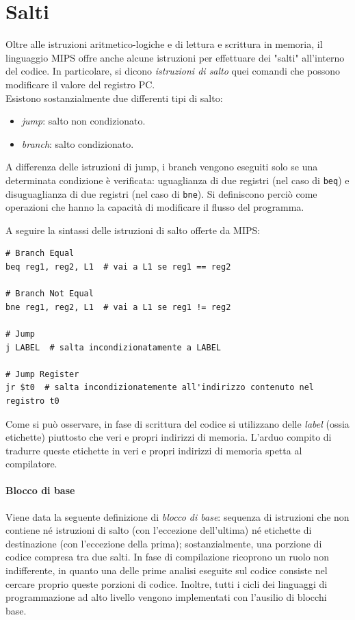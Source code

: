 \documentclass[class=book, crop=false]{standalone}
\begin{document}
\section{Salti}
Oltre alle istruzioni aritmetico-logiche e di lettura e scrittura in memoria, il linguaggio MIPS offre anche alcune istruzioni per effettuare dei "salti" all'interno del codice. In particolare, si dicono \emph{istruzioni di salto} quei comandi che possono modificare il valore del registro PC.\\
Esistono sostanzialmente due differenti tipi di salto:
\begin{itemize}
	\item \emph{jump}: salto non condizionato.
	\item \emph{branch}: salto condizionato.
\end{itemize}
A differenza delle istruzioni di jump, i branch vengono eseguiti solo se una determinata condizione è verificata: uguaglianza di due registri (nel caso di \texttt{beq}) e disuguaglianza di due registri (nel caso di \texttt{bne}). Si definiscono perciò come operazioni che hanno la capacità di modificare il flusso del programma.

A seguire la sintassi delle istruzioni di salto offerte da MIPS:
\begin{verbatim}
# Branch Equal
beq reg1, reg2, L1  # vai a L1 se reg1 == reg2

# Branch Not Equal
bne reg1, reg2, L1  # vai a L1 se reg1 != reg2

# Jump
j LABEL  # salta incondizionatamente a LABEL

# Jump Register
jr $t0  # salta incondizionatemente all'indirizzo contenuto nel registro t0
\end{verbatim}

Come si può osservare, in fase di scrittura del codice si utilizzano delle \emph{label} (ossia etichette) piuttosto che veri e propri indirizzi di memoria. L'arduo compito di tradurre queste etichette in veri e propri indirizzi di memoria spetta al compilatore.

\paragraph*{Blocco di base} Viene data la seguente definizione di \emph{blocco di base}: sequenza di istruzioni che non contiene né istruzioni di salto (con l’eccezione dell’ultima) né etichette di destinazione (con l’eccezione della prima); sostanzialmente, una porzione di codice compresa tra due salti. In fase di compilazione ricoprono un ruolo non indifferente, in quanto una delle prime analisi eseguite sul codice consiste nel cercare proprio queste porzioni di codice. Inoltre, tutti i cicli dei linguaggi di programmazione ad alto livello vengono implementati con l'ausilio di blocchi base.
\end{document}
